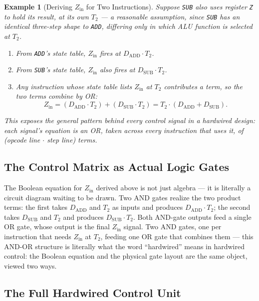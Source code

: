 \documentclass[11pt]{article}
\newtheorem{example}{Example}[section]
\begin{document}
\begin{example}[Deriving $Z_{\text{in}}$ for Two Instructions]
Suppose \texttt{SUB} also uses register \texttt{Z} to hold its result, at its own $T_2$ --- a reasonable assumption, since \texttt{SUB} has an identical three-step shape to \texttt{ADD}, differing only in which ALU function is selected at $T_2$.
\begin{enumerate}
  \item From \texttt{ADD}'s state table, $Z_{\text{in}}$ fires at $D_{\text{ADD}} \cdot T_2$.
  \item From \texttt{SUB}'s state table, $Z_{\text{in}}$ also fires at $D_{\text{SUB}} \cdot T_2$.
  \item Any instruction whose state table lists $Z_{\text{in}}$ at $T_2$ contributes a term, so the two terms combine by OR:
\[
  Z_{\text{in}} = (D_{\text{ADD}} \cdot T_2) + (D_{\text{SUB}} \cdot T_2) = T_2 \cdot (D_{\text{ADD}} + D_{\text{SUB}}).
\]
\end{enumerate}
This exposes the general pattern behind every control signal in a hardwired design: each signal's equation is an OR, taken across every instruction that uses it, of (opcode line $\cdot$ step line) terms.
\end{example}

\subsection{The Control Matrix as Actual Logic Gates}

The Boolean equation for $Z_{\text{in}}$ derived above is not just algebra --- it is literally a circuit diagram waiting to be drawn. Two AND gates realize the two product terms: the first takes $D_{\text{ADD}}$ and $T_2$ as inputs and produces $D_{\text{ADD}} \cdot T_2$; the second takes $D_{\text{SUB}}$ and $T_2$ and produces $D_{\text{SUB}} \cdot T_2$. Both AND-gate outputs feed a single OR gate, whose output is the final $Z_{\text{in}}$ signal. Two AND gates, one per instruction that needs $Z_{\text{in}}$ at $T_2$, feeding one OR gate that combines them --- this AND-OR structure is literally what the word ``hardwired'' means in hardwired control: the Boolean equation and the physical gate layout are the same object, viewed two ways.

\subsection{The Full Hardwired Control Unit}
\end{document}
